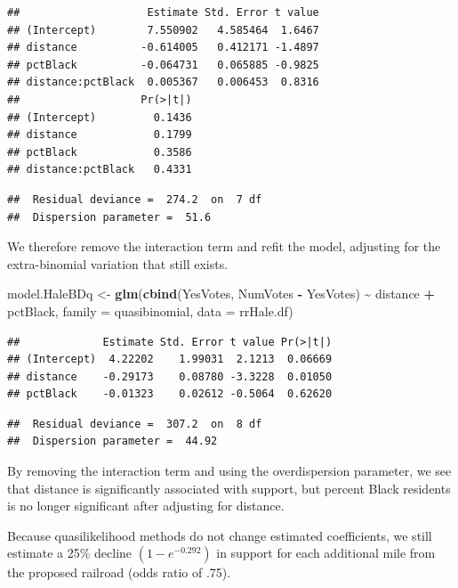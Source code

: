 \documentclass[
]{krantz}
\newenvironment{Shaded}{\begin{snugshade}}{\end{snugshade}}
\newcommand{\AttributeTok}[1]{\textcolor[rgb]{0.27,0.27,0.27}{#1}}
\newcommand{\FunctionTok}[1]{\textcolor[rgb]{0.27,0.27,0.27}{\textbf{#1}}}
\newcommand{\NormalTok}[1]{#1}
\newcommand{\OtherTok}[1]{\textcolor[rgb]{0.37,0.37,0.37}{#1}}
\newcommand{\SpecialCharTok}[1]{\textcolor[rgb]{0.43,0.43,0.43}{\textbf{#1}}}
\begin{document}
\begin{verbatim}
##                    Estimate Std. Error t value
## (Intercept)        7.550902   4.585464  1.6467
## distance          -0.614005   0.412171 -1.4897
## pctBlack          -0.064731   0.065885 -0.9825
## distance:pctBlack  0.005367   0.006453  0.8316
##                   Pr(>|t|)
## (Intercept)         0.1436
## distance            0.1799
## pctBlack            0.3586
## distance:pctBlack   0.4331
\end{verbatim}

\begin{verbatim}
##  Residual deviance =  274.2  on  7 df 
##  Dispersion parameter =  51.6
\end{verbatim}

We therefore remove the interaction term and refit the model, adjusting for the extra-binomial variation that still exists.

\begin{Shaded}
\begin{Highlighting}[]
\NormalTok{model.HaleBDq }\OtherTok{\textless{}{-}} \FunctionTok{glm}\NormalTok{(}\FunctionTok{cbind}\NormalTok{(YesVotes, NumVotes }\SpecialCharTok{{-}}\NormalTok{ YesVotes) }\SpecialCharTok{\textasciitilde{}}
\NormalTok{  distance }\SpecialCharTok{+}\NormalTok{ pctBlack, }
  \AttributeTok{family =}\NormalTok{ quasibinomial, }\AttributeTok{data =}\NormalTok{ rrHale.df)}
\end{Highlighting}
\end{Shaded}

\begin{verbatim}
##             Estimate Std. Error t value Pr(>|t|)
## (Intercept)  4.22202    1.99031  2.1213  0.06669
## distance    -0.29173    0.08780 -3.3228  0.01050
## pctBlack    -0.01323    0.02612 -0.5064  0.62620
\end{verbatim}

\begin{verbatim}
##  Residual deviance =  307.2  on  8 df 
##  Dispersion parameter =  44.92
\end{verbatim}

By removing the interaction term and using the overdispersion parameter, we see that distance is significantly associated with support, but percent Black residents is no longer significant after adjusting for distance.

Because quasilikelihood methods do not change estimated coefficients, we still estimate a 25\% decline \((1-e^{-0.292})\) in support for each additional mile from the proposed railroad (odds ratio of .75).
\end{document}

